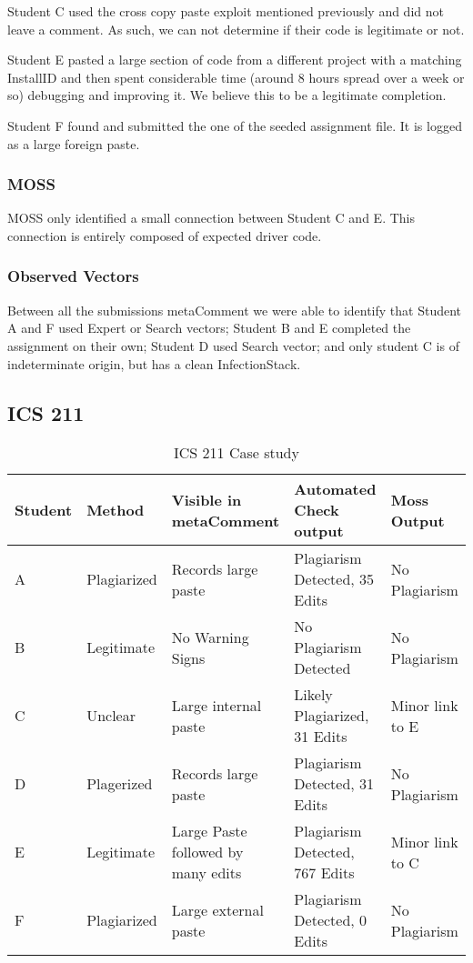 \documentclass[letterpaper,10pt,conference]{IEEEtran}
\newcommand{\installID}{InstallID\xspace}
\newcommand{\metaComment}{metaComment\xspace}
\newcommand{\infectionStack}{InfectionStack\xspace}
\begin{document}
Student C used the cross copy paste exploit mentioned previously and did not leave a comment.  As such, we can not determine if their code is legitimate or not.

Student E pasted a large section of code from a different project with a matching \installID and then spent considerable time (around 8 hours spread over a week or so) debugging and improving it.  We believe this to be a legitimate completion.

Student F found and submitted the one of the seeded assignment file.  It is logged as a large foreign paste.

\subsubsection{MOSS}
MOSS only identified a small connection between Student C and E.  This connection is entirely composed of expected driver code. 
\subsubsection{Observed Vectors}
Between all the submissions \metaComment we were able to identify that Student A and F used Expert or Search vectors; Student B and E completed the assignment on their own; Student D used Search vector; and only student C is of indeterminate origin, but has a clean \infectionStack.

\subsection{ICS 211}
    \label{sec:casestudy211}
\begin{table*}[thb]
    \centering
    \caption{ICS 211 Case study}
    \label{tab:ics211}
    \begin{tabular}{|l|l|l|l|l|}
        \hline
        Student & Method & Visible in \metaComment & Automated Check output & Moss Output \\
        \hline
        A & Plagiarized & Records large paste & Plagiarism Detected, 35 Edits & No Plagiarism \\\rowcolor{Gray}
        B & Legitimate & No Warning Signs & No Plagiarism Detected & No Plagiarism \\
        C & Unclear & Large internal paste & Likely Plagiarized, 31 Edits & Minor link to E \\\rowcolor{Gray}
        D & Plagerized& Records large paste & Plagiarism Detected, 31 Edits & No Plagiarism \\
        E & Legitimate & Large Paste followed by many edits & Plagiarism Detected, 767 Edits & Minor link to C \\\rowcolor{Gray}
        F & Plagiarized & Large external paste & Plagiarism Detected, 0 Edits & No Plagiarism \\
        \hline
    \end{tabular}
\end{table*}
\end{document}
